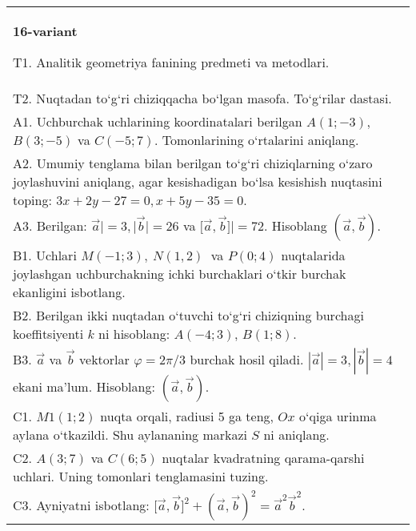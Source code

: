 \documentclass{article}
\begin{document}
\begin{tabular}{m{17cm}}
\textbf{16-variant}
\newline

T1. Analitik geometriya fanining predmeti va metodlari.
 \\
T2. 
Nuqtadan to‘g‘ri chiziqqacha bo‘lgan masofa. To‘g‘rilar dastasi.
 \\
A1. 
Uchburchak uchlarining koordinatalari berilgan
$A (1;-3) $, $B (3;-5) $ va $C (-5;7) $. Tomonlarining o‘rtalarini
aniqlang.
 \\
A2. 
Umumiy tenglama bilan berilgan to‘g‘ri chiziqlarning
o‘zaro joylashuvini aniqlang, agar kesishadigan bo‘lsa kesishish nuqtasini
toping: $3x+2y-27=0, x+5y-35=0$.
 \\
A3. 
Berilgan: $\overrightarrow{a}| = 3,|\overrightarrow{b}| = 26$ va
$\lbrack\overrightarrow{a},\overrightarrow{b}\rbrack| = 72$. Hisoblang
$\left(\overrightarrow{a},\overrightarrow{b} \right) $.
 \\
B1. 
Uchlari \(M (-1;3),\ N (1,2) \ \) va \(P (0;4) \)
nuqtalarida joylashgan uchburchakning ichki burchaklari o‘tkir burchak
ekanligini isbotlang.
 \\
B2. 
Berilgan ikki nuqtadan o‘tuvchi to‘g‘ri chiziqning burchagi
koeffitsiyenti $k$ ni hisoblang: $A (-4;3) $, $B (1;8) $.
 \\
B3. 
$\vec{a}$ va $\vec{b}$ vektorlar $\varphi = 2\pi/3$ burchak hosil qiladi. $|\vec{a}| = 3,|\vec{b}| = 4$ ekani ma’lum. Hisoblang:
$\left(\vec{a},\vec{b} \right) $.
 \\
C1. 
\(M{1} (1; 2) \) nuqta orqali, radiusi 5 ga teng,
$Ox$ o‘qiga urinma aylana o‘tkazildi. Shu aylananing markazi
$S$ ni aniqlang.
 \\
C2. 
\(A (3;7) \) va \(C (6; 5) \) nuqtalar kvadratning
qarama-qarshi uchlari. Uning tomonlari tenglamasini tuzing.
 \\
C3. 
Ayniyatni isbotlang: \(\lbrack\vec{a},\vec{b}\rbrack^{2} + (\vec{a},\vec{b}) ^{2} = {\vec{a}}^{2}{\vec{b}}^{2}\).
 \\

\end{tabular}
\vspace{1cm}
\end{document}
